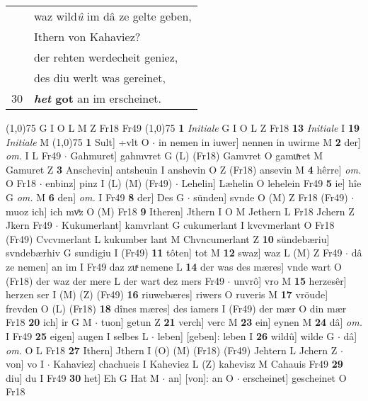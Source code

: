 \documentclass[8pt,a4paper,notitlepage]{article}
\begin{document}
\begin{table}[ht]
\begin{minipage}[t]{0.5\linewidth}
\begin{tabular}{rl}
 & waz wild\textit{û} im dâ ze gelte geben,\\ 
 & Ithern von Kahaviez?\\ 
 & der rehten werdecheit geniez,\\ 
 & des diu werlt was gereinet,\\ 
30 & \textbf{\textit{het} got} an im erscheinet.\\ 
\end{tabular}
\scriptsize
\line(1,0){75} \newline
G I O L M Z Fr18 Fr49 \newline
\line(1,0){75} \newline
\textbf{1} \textit{Initiale} G I O L Z Fr18  \textbf{13} \textit{Initiale} I  \textbf{19} \textit{Initiale} M  \newline
\line(1,0){75} \newline
\textbf{1} Sult] ÷vlt O  $\cdot$ in nemen in iuwer] nennen in uwirme M \textbf{2} der] \textit{om.} I L Fr49  $\cdot$ Gahmuret] gahmvret G (L) (Fr18) Gamvret O gamuͯret M Gamuret Z \textbf{3} Anschevin] antsheuin I anshevin O Z (Fr18) ansevin M \textbf{4} hêrre] \textit{om.} O Fr18  $\cdot$ enbinz] pinz I (L) (M) (Fr49)  $\cdot$ Lehelin] Læhelin O lehelein Fr49 \textbf{5} ie] hîe G \textit{om.} M \textbf{6} den] \textit{om.} I Fr49 \textbf{8} der] Des G  $\cdot$ sünden] svnde O (M) Z Fr18 (Fr49)  $\cdot$ muoz ich] ich mvͦz O (M) Fr18 \textbf{9} Itheren] Jthern I O M Jethern L Fr18 Jchern Z Jkern Fr49  $\cdot$ Kukumerlant] kamvrlant G cukumerlant I kvcvmerlant O Fr18 (Fr49) Cvcvmerlant L kukumber lant M Chvncumerlant Z \textbf{10} sündebæriu] svndebærhiv G sundigiu I (Fr49) \textbf{11} tôten] tot M \textbf{12} swaz] waz L (M) Z Fr49  $\cdot$ dâ ze nemen] an im I Fr49 daz zuͯ nemene L \textbf{14} der was des mæres] vnde wart O (Fr18) der waz der mere L der wart dez mers Fr49  $\cdot$ unvrô] vro M \textbf{15} herzesêr] herzen ser I (M) (Z) (Fr49) \textbf{16} riuwebæres] riwers O ruveris M \textbf{17} vröude] frevden O (L) (Fr18) \textbf{18} dînes mæres] des iamers I (Fr49) der mær O din mær Fr18 \textbf{20} ich] ir G M  $\cdot$ tuon] getun Z \textbf{21} verch] verc M \textbf{23} ein] eynen M \textbf{24} dâ] \textit{om.} I Fr49 \textbf{25} eigen] augen I selbes L  $\cdot$ leben] [geben]: leben I \textbf{26} wildû] wilde G  $\cdot$ dâ] \textit{om.} O L Fr18 \textbf{27} Ithern] Jthern I (O) (M) (Fr18) (Fr49) Jehtern L Jchern Z  $\cdot$ von] vo I  $\cdot$ Kahaviez] chachueis I Kaheviez L (Z) kahevisz M Cahauis Fr49 \textbf{29} diu] du I Fr49 \textbf{30} het] Eh G Hat M  $\cdot$ an] [von]: an O  $\cdot$ erscheinet] gescheinet O Fr18 \newline

\end{minipage}
\end{table}
\end{document}
